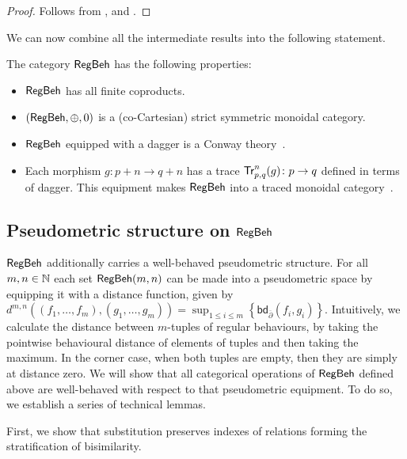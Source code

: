 \begin{proof}
	Follows from ,  and .
\end{proof}
We can now combine all the intermediate results into the following statement.
\begin{theorem}
	The category $\mathsf{RegBeh}$ has the following properties:
	\begin{itemize}
		\item $\mathsf{RegBeh}$ has all finite coproducts. 
		\item $(\mathsf{RegBeh}, \oplus, 0)$ is a (co-Cartesian) strict symmetric monoidal category.
		\item $\mathsf{RegBeh}$ equipped with a dagger is a Conway theory~\cite{Esik:1999:Group}.
		\item Each morphism $g \colon p + n \to q + n$ has a trace $\mathsf{Tr}^{n}_{p,q}(g) \colon p \to q$ defined in terms of dagger. This equipment makes $\mathsf{RegBeh}$ into a traced monoidal category~\cite{Joyal:1996:Traced}. 
	\end{itemize}
\end{theorem} 
\subsection{Pseudometric structure on $\mathsf{RegBeh}$}
$\mathsf{RegBeh}$ additionally carries a well-behaved pseudometric structure. For all $m,n \in \mathbb{N}$ each set $\mathsf{RegBeh}(m,n)$ can be made into a pseudometric space by equipping it with a distance function, given by $d^{m,n}((f_1, \dots, f_m), (g_1, \dots, g_m)) = \sup_{1 \leq i \leq m} \left\{ \mathsf{bd}_{\overline{\partial}}(f_i, g_i) \right\}$.
Intuitively, we calculate the distance between $m$-tuples of regular behaviours, by taking the pointwise behavioural distance of elements of tuples and then taking the maximum. In the corner case, when both tuples are empty, then they are simply at distance zero. We will show that all categorical operations of $\mathsf{RegBeh}$ defined above are well-behaved with respect to that pseudometric equipment. To do so, we establish a series of technical lemmas.

First, we show that substitution preserves indexes of relations forming the stratification of bisimilarity.

